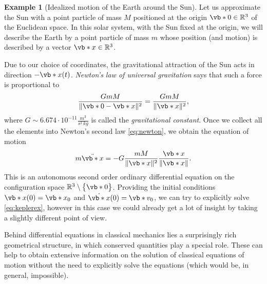 \documentclass[english,fontsize=11pt,paper=b5]{scrbook}
\theoremstyle{definition}
\newtheorem{example}{Example}[chapter]
\begin{document}
  \begin{example}[Idealized motion of the Earth around the Sun]\label{ex:Kepler0}
    Let us approximate the Sun with a point particle of mass $M$ positioned at the origin $\vb*{0}\in\mathbb{R}^3$ of the Euclidean space. In this solar system, with the Sun fixed at the origin, we will describe the Earth by a point particle of mass $m$ whose position (and motion) is described by a vector $\vb*{x}\in\mathbb{R}^3$.

    Due to our choice of coordinates, the gravitational attraction of the Sun acts in direction $-\vb*{x}(t)$. \emph{Newton's law of universal gravitation} says that such a force is proportional to
    \begin{equation}
      \frac{GmM}{\|\vb*{0}-\vb*{x}\|^2} = \frac{GmM}{\|\vb*{x}\|^2},
    \end{equation}
    where $G \sim 6.674 \cdot 10^{-11} \frac{m^3}{s^2\,kg}$ is called the \emph{gravitational constant}.
    Once we collect all the elements into Newton's second law \eqref{eq:newton}, we obtain the equation of motion
    \begin{equation}\label{eq:keplerex}
      m \ddot{\vb*{x}} = - G\frac{mM}{\|\vb*{x}\|^2} \frac{\vb*{x}}{\|\vb*{x}\|}.
    \end{equation}
    This is an autonomous second order ordinary differential equation on the configuration space $\mathbb{R}^3\setminus\big\{\vb*{0}\big\}$.
    Providing the initial conditions $\vb*{x}(0)=\vb*{x}_0$ and $\dot{\vb*{x}}(0)=\vb*{v}_0$, we can try to explicitly solve \eqref{eq:keplerex}, however in this case we could already get a lot of insight by taking a slightly different point of view.

    Behind differential equations in classical mechanics lies a surprisingly rich geometrical structure, in which conserved quantities play a special role.
    These can help to obtain extensive information on the solution of classical equations of motion without the need to explicitly solve the equations (which would be, in general, impossible).


\end{example}
\end{document}
